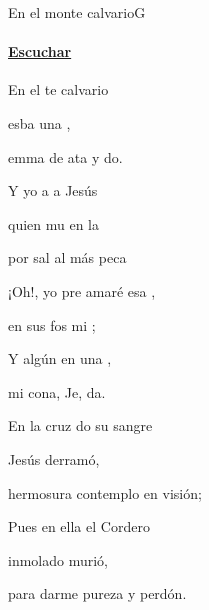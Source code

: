 \documentclass[12pt, spanish]{book}
\begin{document}
    \begin{song}{En el monte calvario}{G}
    {} %
    {}
    {} %
    {}
        \ifChordBk
            \paragraph{\mbox{}\hfill\protect\href{https://open.spotify.com/intl-es/track/02phGrhU7mmWjtPaOKLHN6}{Escuchar}\mbox{}\hfill}
        \fi



        \begin{SBOpGroup}
            En el te calvario

            esba una ,

            emma de ata y do.

            Y yo a a Jesús

            quien mu en la 

            por sal al más  peca
        \end{SBOpGroup}

        \begin{SBChorus}
            ¡Oh!, yo pre amaré esa ,

            en sus fos mi  ;

            Y algún  en   una ,

            mi cona, Je,  da.
        \end{SBChorus}

        \begin{SBOpGroup}
            En la cruz do su sangre

            Jesús derramó,

            hermosura contemplo en visión;

            Pues en ella el Cordero

            inmolado murió,

            para darme pureza y perdón.
        \end{SBOpGroup}


\end{song}
\end{document}
